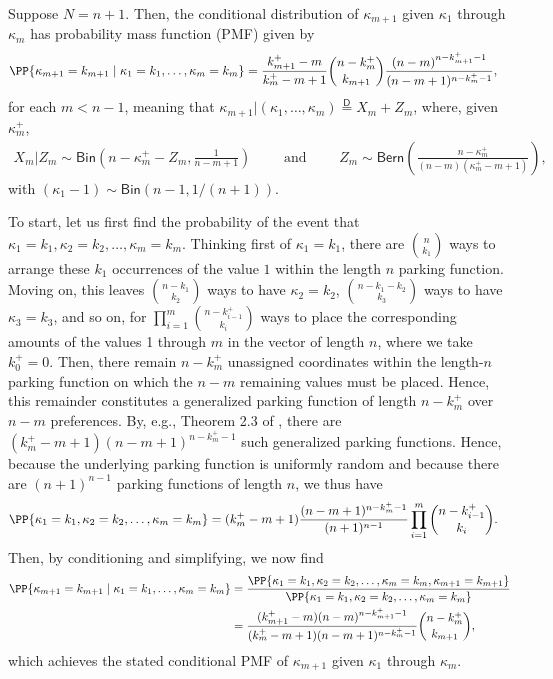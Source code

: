 \begin{lemma}\label{kappaCPMF}
Suppose $N=n+1$. Then, the conditional distribution of $\kappa_{m+1}$ given $\kappa_1$ through $\kappa_m$ has probability mass function (PMF) given by
\begin{align}
\PP{\kappa_{m+1} = k_{m+1} \mid \kappa_1 = k_1, \dots, \kappa_m = k_m}
&=
\frac{k_{m+1}^+ - m}{k_m^+ - m + 1}
{n - k_m^+ \choose k_{m+1}}
\frac{\left(n-m\right)^{n-k_{m+1}^+-1}}{(n-m+1)^{n-k_m^+-1}}
,
\end{align}
for each $m < n - 1$, meaning that $\kappa_{m+1} | (\kappa_1, \dots, \kappa_m) \stackrel{\mathsf{D}}{=} X_m + Z_m$, where, given $\kappa_m^+$,
\begin{align}
X_m | Z_m
\sim 
\mathsf{Bin}\left(
n - \kappa_m^+ - Z_m
,
\frac{1}{n-m+1}
\right)
\qquad
\text{ and }
\qquad
Z_m \sim 
\mathsf{Bern}\left(\frac{n-\kappa_m^+}{(n-m)(\kappa_m^+ - m + 1)} \right)
,
\end{align}
with $(\kappa_1 - 1) \sim \mathsf{Bin}\left(n-1, 1/(n+1)\right)$.
\end{lemma}
To start, let us first find the probability of the event that $\kappa_1 = k_1, \kappa_2 = k_2, \dots, \kappa_m = k_m$. Thinking first of $\kappa_1 = k_1$, there are ${n \choose k_1}$ ways to arrange these $k_1$ occurrences of the value $1$ within the length $n$ parking function. Moving on, this leaves ${n - k_1 \choose k_2}$ ways to have $\kappa_2 = k_2$, ${n - k_1 - k_2 \choose k_3}$ ways to have $\kappa_3 = k_3$, and so on, for $\prod_{i=1}^m {n - k_{i-1}^+ \choose k_i}$ ways to place the corresponding amounts of the values 1 through $m$ in the vector of length $n$, where we take $k_0^+ = 0$. Then, there remain $n - k_m^+$ unassigned coordinates within the length-$n$ parking function on which the $n-m$ remaining values must be placed. Hence, this remainder constitutes a generalized parking function of length $n - k_m^+$ over $n-m$ preferences. By, e.g., Theorem 2.3 of \citet{kenyon2023parking}, there are $(k_m^+-m+1)(n-m+1)^{n - k_m^+-1}$ such generalized parking functions. Hence, because the underlying parking function is uniformly random and because there are $(n+1)^{n-1}$ parking functions of length $n$, we thus have
\begin{align}
\PP{\kappa_1 = k_1, \kappa_2 = k_2, \dots, \kappa_m = k_m}
&=
(k_m^+-m+1)
\frac{(n-m+1)^{n - k_m^+-1}}{(n+1)^{n-1}}
\prod_{i=1}^m {n - k_{i-1}^+ \choose k_i}
.
\end{align}
Then, by conditioning and simplifying, we now find
\begin{align}
\PP{\kappa_{m+1} = k_{m+1} \mid \kappa_1 = k_1, \dots, \kappa_m = k_m}
&=
\frac{\PP{\kappa_1 = k_1, \kappa_2 = k_2, \dots, \kappa_m = k_m, \kappa_{m+1} = k_{m+1}}}{\PP{\kappa_1 = k_1, \kappa_2 = k_2, \dots, \kappa_m = k_m}}
\\
&=
\frac{
(k_{m+1}^+-m)
(n-m)^{n - k_{m+1}^+-1}
}
{
(k_m^+-m+1)
(n-m+1)^{n - k_m^+-1}
}
{n - k_{m}^+ \choose k_{m+1}}
,
\end{align}
which achieves the stated conditional PMF of $\kappa_{m+1}$ given $\kappa_1$ through $\kappa_m$.

